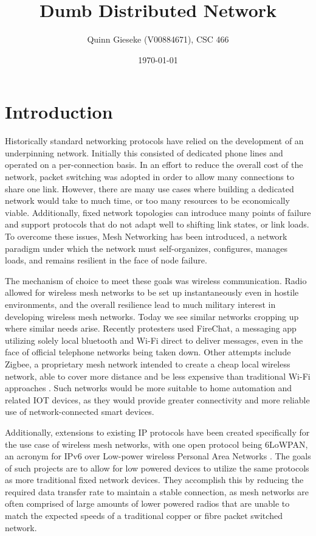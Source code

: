 \documentclass{article}
\begin{document}
\title{Dumb Distributed Network}

\author{Quinn Gieseke (V00884671), CSC 466}

\date{\today}

\maketitle
\section{Introduction}
Historically standard networking protocols have relied on the development of an underpinning network. Initially this consisted of dedicated phone lines and operated on a per-connection basis. In an effort to reduce the overall cost of the network, packet switching was adopted in order to allow many connections to share one link. However, there are many use cases where building a dedicated network would take to much time, or too many resources to be economically viable. Additionally, fixed network topologies can introduce many points of failure and support protocols that do not adapt well to shifting link states, or link loads. To overcome these issues, Mesh Networking has been introduced, a network paradigm under which the network must self-organizes, configures, manages loads, and remains resilient in the face of node failure. 

The mechanism of choice to meet these goals was wireless communication. Radio allowed for wireless mesh networks to be set up instantaneously even in hostile environments, and the overall resilience lead to much military interest in developing wireless mesh networks. Today we see similar networks cropping up where similar needs arise. Recently protesters used FireChat, a messaging app utilizing solely local bluetooth and Wi-Fi direct to deliver messages, even in the face of official telephone networks being taken down. Other attempts include Zigbee, a proprietary mesh network intended to create a cheap local wireless network, able to cover more distance and be less expensive than traditional Wi-Fi approaches \cite{zigbee}. Such networks would be more suitable to home automation and related IOT devices, as they would provide greater connectivity and more reliable use of network-connected smart devices. 

Additionally, extensions to existing IP protocols have been created specifically for the use case of wireless mesh networks, with one open protocol being 6LoWPAN, an acronym for IPv6 over Low-power wireless Personal Area Networks \cite{6LoWPAN}. The goals of such projects are to allow for low powered devices to utilize the same protocols as more traditional fixed network devices. They accomplish this by reducing the required data transfer rate to maintain a stable connection, as mesh networks are often comprised of large amounts of lower powered radios that are unable to match the expected speeds of a traditional copper or fibre packet switched network.
\end{document}
